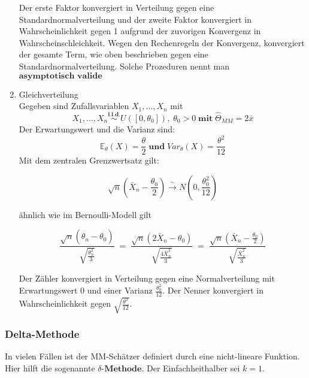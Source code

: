\documentclass[10pt]{article}
\newcommand{\FZV}{X_1, \ldots, X_n} %
\newcommand{\EW}{\mathbb{E}} %
\newcommand{\KV}{\overset{\sim} \longrightarrow} %
\begin{document}
\begin{enumerate}[label = (\roman*)]
		Der erste Faktor konvergiert in Verteilung gegen eine Standardnormalverteilung und der zweite Faktor konvergiert in Wahrscheinlichkeit gegen 1 aufgrund der zuvorigen Konvergenz in Wahrscheinschleichkeit. 
		Wegen den Rechenregeln der Konvergenz, konvergiert der gesamte Term, wie oben beschrieben gegen eine Standardnormalverteilung. 
		Solche Prozeduren nennt man $\textbf{asymptotisch valide}$
		
		
		
		
		\item Gleichverteilung\\
		Gegeben sind Zufallsvariablen $\FZV$ mit
		\begin{equation*}
			\FZV \overset{\textbf{i.i.d.}}{\sim} U([0,\theta_0]), \; \theta_0 >0 \;\textbf{mit}\; \hat{\Theta}_{MM} = 2\bar{x}
		\end{equation*}
		Der Erwartungswert und die Varianz sind: 
		\begin{equation*}
			\EW_\theta (X) = \frac{\theta}{2} \; \textbf{und} \; Var_\theta (X) = \frac{\theta^2}{12}
		\end{equation*}
		Mit dem zentralen Grenzwertsatz gilt:
		
		\begin{equation*}
			\sqrt{n} \left(\bar{X}_n - \frac{\theta_0}{2}\right) \KV N\left(0, \frac{\theta^2_0}{12}\right)
		\end{equation*}
		
		ähnlich wie im Bernoulli-Modell gilt
		
		\begin{equation*}
			\frac{\sqrt{n}(\hat{\theta}_n - \theta_0)}{\sqrt{\frac{\theta^2_n}{3}}} \; = \; 
			\frac{\sqrt{n}(2 \bar{X}_n - \theta_0)}{\sqrt{\frac{4\bar{X}^2_n}{3}}} \; = \; \frac{\sqrt{n}(\bar{X}_n - \frac{\theta_0}{2})}{\sqrt{\frac{\bar{X}^2_n}{3}}}	
		\end{equation*}
		
		Der Zähler konvergiert in Verteilung gegen eine Normalverteilung mit Erwartungswert 0 und einer Varianz $\frac{\theta^2_0}{12}$. Der Nenner konvergiert in Wahrscheinlichkeit gegen $\sqrt{\frac{\theta^2}{12}}$. 
		
	\end{enumerate}	
	
	
	\subsubsection{Delta-Methode}
	\noindent In vielen Fällen ist der MM-Schätzer definiert durch eine nicht-lineare Funktion. Hier hilft die sogenannte $\delta \textbf{-Methode}$. Der Einfachheithalber sei $k = 1$.
	
\end{document}
